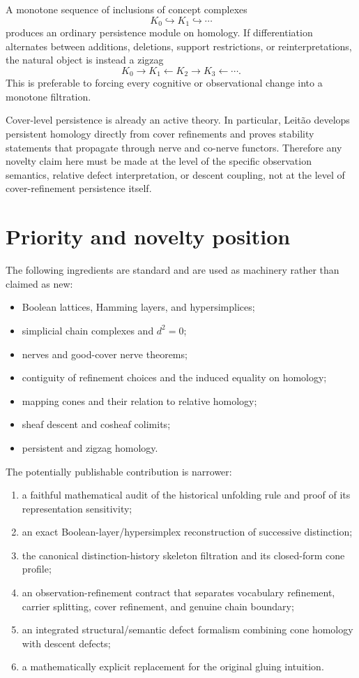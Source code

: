 \documentclass[11pt]{article}
\begin{document}
A monotone sequence of inclusions of concept complexes
\[
K_0\hookrightarrow K_1\hookrightarrow\cdots
\]
produces an ordinary persistence module on homology.  If differentiation alternates between additions, deletions, support restrictions, or reinterpretations, the natural object is instead a zigzag
\[
K_0\to K_1\leftarrow K_2\to K_3\leftarrow\cdots.
\]
This is preferable to forcing every cognitive or observational change into a monotone filtration.

Cover-level persistence is already an active theory.  In particular, Leit\~ao develops persistent homology directly from cover refinements and proves stability statements that propagate through nerve and co-nerve functors.  Therefore any novelty claim here must be made at the level of the specific observation semantics, relative defect interpretation, or descent coupling, not at the level of cover-refinement persistence itself.

\section{Priority and novelty position}

The following ingredients are standard and are used as machinery rather than claimed as new:
\begin{itemize}
\item Boolean lattices, Hamming layers, and hypersimplices;
\item simplicial chain complexes and $d^2=0$;
\item nerves and good-cover nerve theorems;
\item contiguity of refinement choices and the induced equality on homology;
\item mapping cones and their relation to relative homology;
\item sheaf descent and cosheaf colimits;
\item persistent and zigzag homology.
\end{itemize}

The potentially publishable contribution is narrower:
\begin{enumerate}[label=(\arabic*)]
\item a faithful mathematical audit of the historical unfolding rule and proof of its representation sensitivity;
\item an exact Boolean-layer/hypersimplex reconstruction of successive distinction;
\item the canonical distinction-history skeleton filtration and its closed-form cone profile;
\item an observation-refinement contract that separates vocabulary refinement, carrier splitting, cover refinement, and genuine chain boundary;
\item an integrated structural/semantic defect formalism combining cone homology with descent defects;
\item a mathematically explicit replacement for the original gluing intuition.
\end{enumerate}
\end{document}
